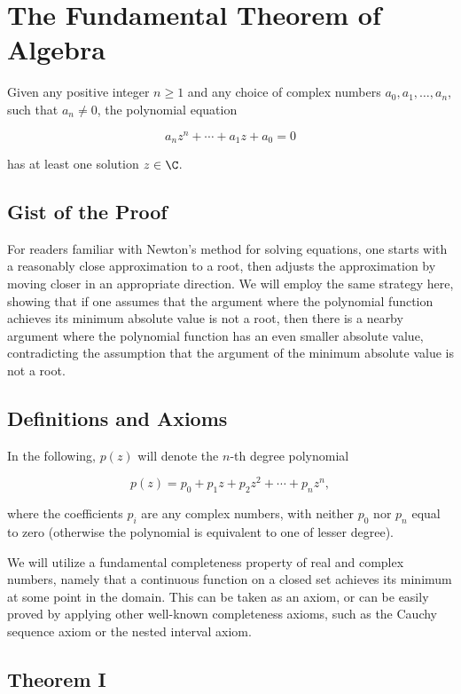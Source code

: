 \newpage
\section{The Fundamental Theorem of Algebra}

Given any positive integer \(n \geq 1\) and any choice of complex numbers \(a_0, a_1, \ldots, a_n\), 
such that \(a_n \neq 0\), the polynomial equation

\[
	a_n z^n + \cdots + a_1 z + a_0 = 0 
\]

has at least one solution \(z \in \C\).

\subsection{Gist of the Proof}

For readers familiar with Newton’s method for solving equations, one starts with a reasonably close 
approximation to a root, then adjusts the approximation by moving closer in an appropriate direction. 
We will employ the same strategy here, showing that if one assumes that the argument where the polynomial 
function achieves its minimum absolute value is not a root, then there is a nearby argument where the 
polynomial function has an even smaller absolute value, contradicting the assumption that the argument of 
the minimum absolute value is not a root.

\subsection{Definitions and Axioms}

In the following, \(p(z)\) will denote the \(n\)-th degree polynomial

\[
	p(z) = p_0 + p_1 z + p_2 z^2 + \cdots + p_n z^n,
\]

where the coefficients \(p_i\) are any complex numbers, with neither \(p_0\) nor \(p_n\) equal to zero 
(otherwise the polynomial is equivalent to one of lesser degree).

We will utilize a fundamental completeness property of real and complex numbers, namely that a continuous 
function on a closed set achieves its minimum at some point in the domain. This can be taken as an axiom, 
or can be easily proved by applying other well-known completeness axioms, such as the Cauchy sequence 
axiom or the nested interval axiom.

\subsection{Theorem I}

